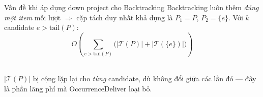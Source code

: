\documentclass[9pt, aspectratio=169]{beamer}
\begin{document}
\begin{frame}{Vấn đề khi áp dụng down project cho Backtracking}
  Backtracking luôn thêm \emph{đúng một item} mỗi lượt $\Rightarrow$ cặp tách
  duy nhất khả dụng là $P_1=P$, $P_2=\{e\}$. Với $k$ candidate $e>\mathrm{tail}(P)$:
  \begin{equation}
    O\!\left(\sum_{e>\mathrm{tail}(P)} \bigl(|\mathcal T(P)|+|\mathcal T(\{e\})|\bigr)\right)
  \end{equation}
  \centering
  \\
  \vspace{0.2em}
  \footnotesize\color{black!60} $|\mathcal T(P)|$ bị cộng lặp lại cho \emph{từng}
  candidate, dù không đổi giữa các lần đó — đây là phần lãng phí mà
  OccurrenceDeliver loại bỏ.
\end{frame}
\end{document}

